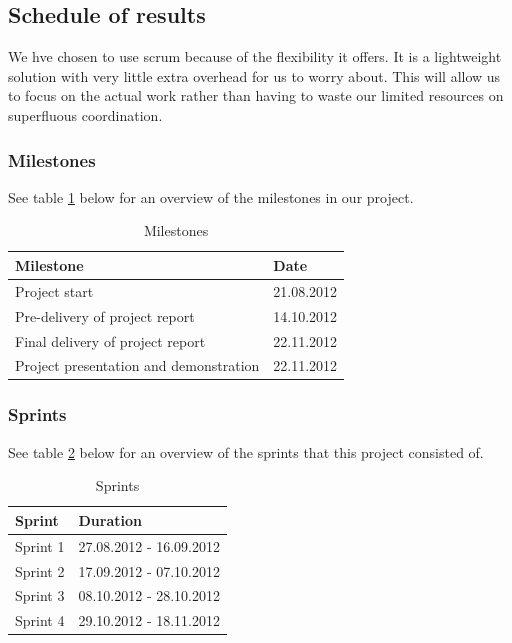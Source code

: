 \subsection{Schedule of results}
We hve chosen to use scrum because of the flexibility it offers. It is a lightweight solution with very little extra overhead for us to worry about. This will allow us to focus on the actual work rather than having to waste our limited resources on superfluous coordination.

\subsubsection*{Milestones}
See table \ref{tab:milestones} below for an overview of the milestones in our project.
\begin{table}[h!]
\begin{center}
\begin{tabular}{l|l} \hline
\textbf{Milestone} & \textbf{Date} \\ \hline \hline
Project start &  21.08.2012\\ 
Pre-delivery of project report & 14.10.2012\\ 
Final delivery of project report & 22.11.2012\\
Project presentation and demonstration & 22.11.2012\\ \hline
\end{tabular}
\end{center}
\caption{Milestones} \label{tab:milestones}
\end{table}

\newpage

\subsubsection*{Sprints}
See table \ref{tab:sprints} below for an overview of the sprints that this project consisted of.
\begin{table}[h!]
\begin{center}
\begin{tabular}{l|l} \hline
\textbf{Sprint} & \textbf{Duration} \\ \hline \hline
Sprint 1 &  27.08.2012 - 16.09.2012\\
Sprint 2 & 17.09.2012 - 07.10.2012\\
Sprint 3 & 08.10.2012 - 28.10.2012\\
Sprint 4 & 29.10.2012 - 18.11.2012\\ \hline
\end{tabular}
\end{center}
\caption{Sprints} \label{tab:sprints}
\end{table}


